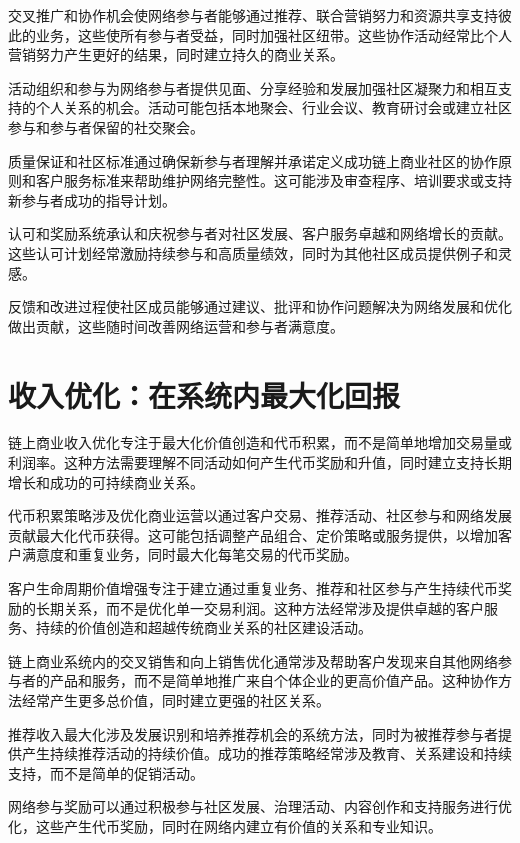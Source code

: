 \documentclass[
  Letterpaper,
]{scrbook}
\begin{document}
交叉推广和协作机会使网络参与者能够通过推荐、联合营销努力和资源共享支持彼此的业务，这些使所有参与者受益，同时加强社区纽带。这些协作活动经常比个人营销努力产生更好的结果，同时建立持久的商业关系。

活动组织和参与为网络参与者提供见面、分享经验和发展加强社区凝聚力和相互支持的个人关系的机会。活动可能包括本地聚会、行业会议、教育研讨会或建立社区参与和参与者保留的社交聚会。

质量保证和社区标准通过确保新参与者理解并承诺定义成功链上商业社区的协作原则和客户服务标准来帮助维护网络完整性。这可能涉及审查程序、培训要求或支持新参与者成功的指导计划。

认可和奖励系统承认和庆祝参与者对社区发展、客户服务卓越和网络增长的贡献。这些认可计划经常激励持续参与和高质量绩效，同时为其他社区成员提供例子和灵感。

反馈和改进过程使社区成员能够通过建议、批评和协作问题解决为网络发展和优化做出贡献，这些随时间改善网络运营和参与者满意度。

\section{收入优化：在系统内最大化回报}\label{ux6536ux5165ux4f18ux5316ux5728ux7cfbux7edfux5185ux6700ux5927ux5316ux56deux62a5}

链上商业收入优化专注于最大化价值创造和代币积累，而不是简单地增加交易量或利润率。这种方法需要理解不同活动如何产生代币奖励和升值，同时建立支持长期增长和成功的可持续商业关系。

代币积累策略涉及优化商业运营以通过客户交易、推荐活动、社区参与和网络发展贡献最大化代币获得。这可能包括调整产品组合、定价策略或服务提供，以增加客户满意度和重复业务，同时最大化每笔交易的代币奖励。

客户生命周期价值增强专注于建立通过重复业务、推荐和社区参与产生持续代币奖励的长期关系，而不是优化单一交易利润。这种方法经常涉及提供卓越的客户服务、持续的价值创造和超越传统商业关系的社区建设活动。

链上商业系统内的交叉销售和向上销售优化通常涉及帮助客户发现来自其他网络参与者的产品和服务，而不是简单地推广来自个体企业的更高价值产品。这种协作方法经常产生更多总价值，同时建立更强的社区关系。

推荐收入最大化涉及发展识别和培养推荐机会的系统方法，同时为被推荐参与者提供产生持续推荐活动的持续价值。成功的推荐策略经常涉及教育、关系建设和持续支持，而不是简单的促销活动。

网络参与奖励可以通过积极参与社区发展、治理活动、内容创作和支持服务进行优化，这些产生代币奖励，同时在网络内建立有价值的关系和专业知识。
\end{document}
